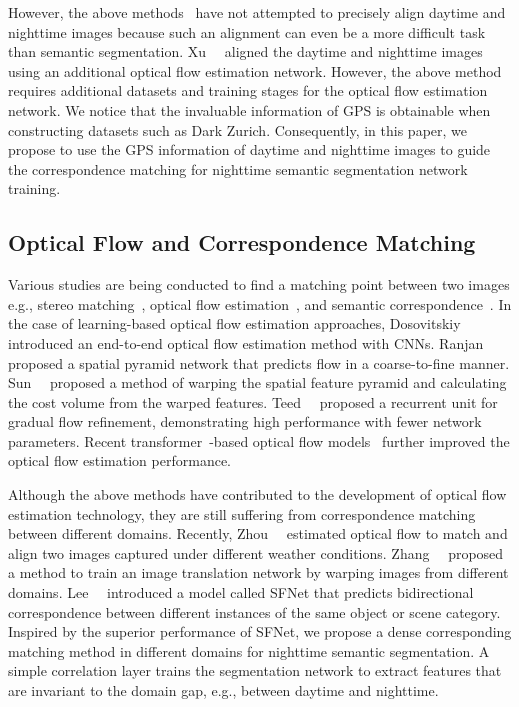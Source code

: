 \documentclass[10pt,twocolumn,letterpaper]{article}
\begin{document}
However, the above methods~\cite{sakaridis2019guided,sakaridis2020map-guided,wu2021dannet,xu2021cdada} have not attempted to precisely align daytime and nighttime images because such an alignment can even be a more difficult task than semantic segmentation. Xu~\etal~\cite{wu2021dania} aligned the daytime and nighttime images using an additional optical flow estimation network. However, the above method requires additional datasets and training stages for the optical flow estimation network. We notice that the invaluable information of GPS is obtainable when constructing datasets such as Dark Zurich. Consequently, in this paper, we propose to use the GPS information of daytime and nighttime images to guide the correspondence matching for nighttime semantic segmentation network training.


\subsection{Optical Flow and Correspondence Matching}
Various studies are being conducted to find a matching point between two images e.g., stereo matching~\cite{5995372,6751115,6888475}, optical flow estimation~\cite{dosovitskiy2015flownet,ilg2017flownet}, and semantic correspondence~\cite{lee2020learning-sfnet,lee2019sfnet}. In the case of learning-based optical flow estimation approaches, Dosovitskiy~\etal~\cite{dosovitskiy2015flownet} introduced an end-to-end optical flow estimation method with CNNs. Ranjan~\etal~\cite{ranjan2017optical} proposed a spatial pyramid network that predicts flow in a coarse-to-fine manner. Sun~\etal~\cite{sun2018pwc} proposed a method of warping the spatial feature pyramid and calculating the cost volume from the warped features. Teed~\etal~\cite{teed2020raft} proposed a recurrent unit for gradual flow refinement, demonstrating high performance with fewer network parameters. Recent transformer~\cite{vaswani2017transformer}-based optical flow models~\cite{jiang2021GMA,xu2021high,xu2021gmflow} further improved the optical flow estimation performance.

Although the above methods have contributed to the development of optical flow estimation technology, they are still suffering from correspondence matching between different domains. Recently, Zhou~\etal~\cite{zhou2020cross-weather} estimated optical flow to match and align two images captured under different weather conditions. Zhang~\etal~\cite{zhang2020cross} proposed a method to train an image translation network by warping images from different domains. Lee~\etal~\cite{lee2020learning-sfnet,lee2019sfnet} introduced a model called SFNet that predicts bidirectional correspondence between different instances of the same object or scene category. Inspired by the superior performance of SFNet, we propose a dense corresponding matching method in different domains for nighttime semantic segmentation. A simple correlation layer trains the segmentation network to extract features that are invariant to the domain gap, e.g., between daytime and nighttime.
\end{document}
